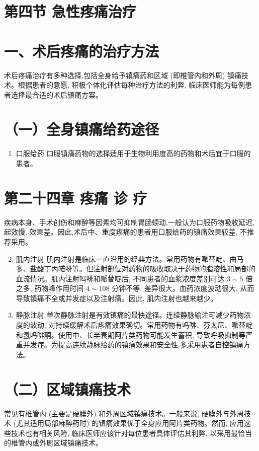 \documentclass[10pt]{article}
\begin{document}
\section*{第四节 急性疼痛治疗}
\section*{一、术后疼痛的治疗方法}
术后疼痛治疗有多种选择,包括全身给予镇痛药和区域 (即椎管内和外周) 镇痛技术。根据患者的意愿, 积极个体化评估每种治疗方法的利弊, 临床医师能为每例患者选择最合适的术后镇痛方案。

\section*{（一）全身镇痛给药途径}
\begin{enumerate}
  \item 口服给药 口服镇痛药物的选择适用于生物利用度高的药物和术后宜于口服的患者。
\end{enumerate}

\section*{第二十四章 疼痛 诊 疗}
疾病本身、手术创伤和麻醉等因素均可抑制胃肠蝡动,一般认为口服药物吸收延迟, 起效慢, 效果差。因此,术后中、重度疼痛的患者用口服给药的镇痛效果较差, 不推荐采用。

\begin{enumerate}
  \setcounter{enumi}{1}
  \item 肌内注射 肌内注射是临床一直沿用的经典方法。常用药物有哌替啶、曲马多、盐酸丁丙喏啡等。但注射部位对药物的吸收取决于药物的脂溶性和局部的血流情况。肌内注射吗啡和哌替啶后, 不同患者的血浆浓度差别可达 $3 \sim 5$ 倍之多, 药物峰作用时间 $4 \sim 108$ 分钟不等, 差异很大。血药浓度波动很大, 从而导致镇痛不全或并发症以及注射痛。因此, 肌内注射也越来越少。

  \item 静脉注射 单次静脉注射是有效镇痛的最快途径。连续静脉输注可减少药物浓度的波动, 对持续缓解术后疼痛效果确切。常用药物有吗啡、芬太尼、哌替啶和氢吗啡酮。使用中、长半衰期阿片类药物可能发生蓄积, 导致呼吸抑制等严重并发症。为提高连续静脉给药的镇痛效果和安全性,多采用患者自控镇痛方法。

\end{enumerate}

\section*{（二）区域镇痛技术}
常见有椎管内 (主要是硬膜外) 和外周区域镇痛技术。一般来说, 硬膜外与外周技术 (尤其适用局部麻醉药时) 的镇痛效果优于全身应用阿片类药物。然而, 应用这些技术也有相关风险, 临床医师应该针对每位患者具体评估其利弊, 以采用最恰当的椎管内或外周区域镇痛技术。
\end{document}
